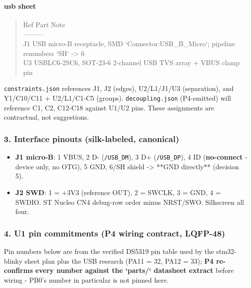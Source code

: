 \documentclass[11pt,a4paper]{article}
\begin{document}
\paragraph*{usb sheet}
\begin{quote}\small\ttfamily\raggedright
\textbar{} Ref \textbar{} Part \textbar{} Note \textbar{}\\
\textbar{}---\textbar{}---\textbar{}---\textbar{}\\
\textbar{} J1 \textbar{} USB micro-B receptacle, SMD \textbar{} `Connector:USB\_B\_Micro`; pipeline renumbers `SH` -\textgreater{} 6 \textbar{}\\
\textbar{} U3 \textbar{} USBLC6-2SC6, SOT-23-6 \textbar{} 2-channel USB TVS array + VBUS clamp pin \textbar{}
\end{quote}
\texttt{constraints.json} references J1, J2 (edges), U2/L1/J1/U3 (separation), and Y1/C10/C11 + U2/L1/C1-C5 (groups). \texttt{decoupling.json} (P4-emitted) will reference C1, C2, C12-C18 against U1/U2 pins. These assignments are contractual, not suggestions.

\subsubsection*{3. Interface pinouts (silk-labeled, canonical)}
\begin{itemize}
\item \textbf{J1 micro-B}: 1 VBUS, 2 D- (\texttt{/USB\_DM}), 3 D+ (\texttt{/USB\_DP}), 4 ID
(\textbf{no-connect} - device only, no OTG), 5 GND, 6/SH shield -\textgreater{} {*}{*}GND
directly{*}{*} (decision 5).
\item \textbf{J2 SWD}: 1 = +3V3 (reference OUT), 2 = SWCLK, 3 = GND, 4 = SWDIO. ST
Nucleo CN4 debug-row order minus NRST/SWO. Silkscreen all four.
\end{itemize}
\subsubsection*{4. U1 pin commitments (P4 wiring contract, LQFP-48)}
Pin numbers below are from the verified DS5319 pin table used by the stm32-blinky sheet plan plus the USB research (PA11 = 32, PA12 = 33); \textbf{P4 re-confirms every number against the `parts/` datasheet extract} before wiring - PB0's number in particular is not pinned here.
\end{document}

